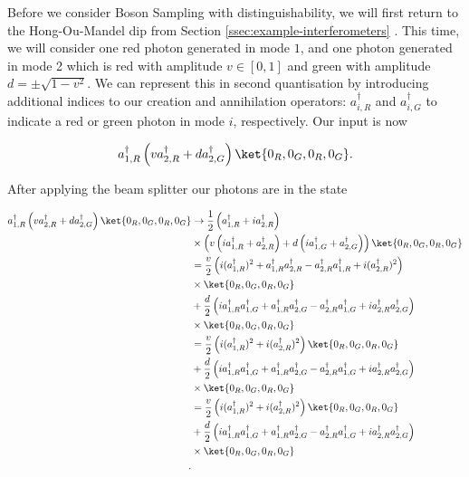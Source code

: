 Before we consider Boson Sampling with distinguishability, we will first return to the Hong-Ou-Mandel dip from Section \ref{ssec:example-interferometers} \cite{hong1987}. This time, we will consider one red photon generated in mode $1$, and one photon generated in mode 2 which is red with amplitude $v\in [0,1]$ and green with amplitude $d=\pm\sqrt{1-v^2}$. We can represent this in second quantisation by introducing additional indices to our creation and annihilation operators: $a_{i,R}^\dagger$ and $a_{i,G}^\dagger$ to indicate a red or green photon in mode $i$, respectively. Our input is now

\begin{equation}
a_{1,R}^\dagger\left(v a_{2,R}^\dagger + da_{2,G}^\dagger\right)\ket{0_R,0_G,0_R,0_G}.
\end{equation}

After applying the beam splitter our photons are in the state

\begin{align}
a_{1,R}^\dagger\left(v a_{2,R}^\dagger + da_{2,G}^\dagger\right)\ket{0_R,0_G,0_R,0_G} &\rightarrow \frac{1}{2}\left(a_{1,R}^\dagger + ia_{2,R}^\dagger\right)\nonumber\\
&\times\left(v\left(ia_{1,R}^\dagger + a_{2,R}^\dagger\right) + d\left(ia_{1,G}^\dagger + a_{2,G}^\dagger\right)\right)\ket{0_R,0_G,0_R,0_G}\\
&= \frac{v}{2}\left(i(a_{1,R}^\dagger)^2 + a_{1,R}^\dagger a_{2,R}^\dagger - a_{2,R}^\dagger a_{1,R}^\dagger+i(a_{2,R}^\dagger)^2\right)\nonumber\\
&\times\ket{0_R,0_G,0_R,0_G}\nonumber\\
&+\frac{d}{2}\left(ia_{1,R}^\dagger a_{1,G}^\dagger + a_{1,R}^\dagger a_{2,G}^\dagger - a_{2,R}^\dagger a_{1,G}^\dagger+ia_{2,R}^\dagger a_{2,G}^\dagger \right)\nonumber\\
&\times\ket{0_R,0_G,0_R,0_G}\nonumber\\
&= \frac{v}{2}\left(i(a_{1,R}^\dagger)^2 +i(a_{2,R}^\dagger)^2\right)\ket{0_R,0_G,0_R,0_G}\nonumber\\
&+\frac{d}{2}\left(ia_{1,R}^\dagger a_{1,G}^\dagger + a_{1,R}^\dagger a_{2,G}^\dagger - a_{2,R}^\dagger a_{1,G}^\dagger+ia_{2,R}^\dagger a_{2,G}^\dagger \right)\nonumber\\
&\times\ket{0_R,0_G,0_R,0_G}\nonumber\\
&= \frac{v}{2}\left(i(a_{1,R}^\dagger)^2 +i(a_{2,R}^\dagger)^2\right)\ket{0_R,0_G,0_R,0_G}\nonumber\\
&+\frac{d}{2}\left(ia_{1,R}^\dagger a_{1,G}^\dagger + a_{1,R}^\dagger a_{2,G}^\dagger - a_{2,R}^\dagger a_{1,G}^\dagger+ia_{2,R}^\dagger a_{2,G}^\dagger \right)\nonumber\\
&\times\ket{0_R,0_G,0_R,0_G}\\.
\end{align}

